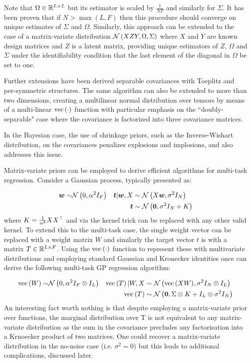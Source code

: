 Note that $\Omega \in { \mathbb{R}^{L \times L} }$ but its estimator is scaled by $\frac{1}{N F}$ and similarly for $\Sigma$. It has been proven that if $N > \max(L, F)$ then this procedure should converge on unique estimates of $\Sigma$ and $\Omega$\cite{Srivastava2009}. Similarly, this approach can be extended\cite{Srivastava2009a} to the case of a matrix-variate distribution $\mathcal{N} \left(XZY, \Omega, \Sigma\right)$ where $X$ and $Y$ are known design matrices and $Z$ is a latent matrix, providing unique estimators of $Z$, $\Omega$ and $\Sigma$ under the identifiability condition that the last element of the diagonal in $\Omega$ be set to one.

Further extensions have been derived separable covariances with Toeplitz\cite{Wirfalt2010} and per-symmetric\cite{Jansson} structures. The same algorithm can also be extended to more than two dimensions\cite{Ohlson2011}\cite{Ohlson2013}, creating a multilinear normal distribution over tensors by means of a multi-linear $\text{vec}\left(\cdot\right)$ function with particular emphasis on the ``doubly-separable" case where the covariance is factorized into three covariance matrices.

In the Bayesian case, the use of shrinkage priors, such as the Inverse-Wishart distribution, on the covariances penalizes explosions and implosions\cite{Archambeau2011}, and also addresses this issue.

Matrix-variate priors can be employed to derive efficient algorithms for multi-task regression. Consider a Gaussian process, typically\cite{Bishop2006} presented as:

\begin{align}
\bm w \sim & \mathcal{N} \left( {0}, {\alpha^2 I_F} \right) & \bm t|\bm w,X & \sim \mathcal{N} \left( {X\bm w}, {\sigma^2 I_N} \right) \\
& & \bm t & \sim \mathcal{N} \left( {\bm 0}, {\sigma^2I_N + K} \right)
\end{align}
where $K = \frac{1}{\alpha^2} X X^\top$ and via the kernel trick\cite{Jst2004} can be replaced with any other valid kernel. To extend this to the multi-task case, the single weight vector can be replaced with a weight matrix $W$ and similarly the target vector $t$ is with a matrix $T \in { \mathbb{R}^{L \times F} }$. Using the $\text{vec}\left(\cdot\right)$ function to represent these with multivariate distributions and employing standard Gaussian\cite{Bishop2006} and Kronecker\cite{Minka2000a} identities once can derive the following multi-task GP regression algorithm\cite{Bonilla2008}:

\begin{align}
\text{vec}\left(W\right) \sim & \mathcal{N} \left( {0}, {\alpha^2 I_F \otimes I_L} \right) & \text{vec}\left(T\right)|W,X & \sim \mathcal{N} \left( {\text{vec}\left(XW\right)}, {\sigma^2 I_N \otimes I_L} \right) \\
& & \text{vec}\left(T\right) & \sim \mathcal{N} \left( {\bm 0}, {\Sigma \otimes K + I_L \otimes \sigma^2I_N} \right)
\end{align}
An interesting fact worth nothing is that despite employing a matrix-variate prior over functions, the marginal distribution over T is not equivalent to any matrix-variate distribution as the sum in the covariance precludes any factorisation into a Krnoecker product of two matrices. One could recover a matrix-variate distribution in the no-noise case (i.e. $\sigma^2 = 0$) but this leads to additional complications, discussed later.

